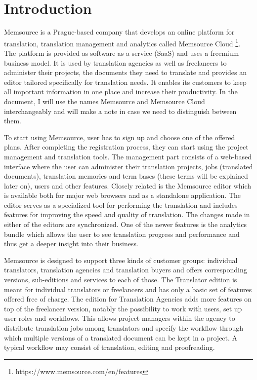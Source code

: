 
\chapter{Introduction}

Memsource is a Prague-based company that develops an online platform for translation, translation management and analytics called Memsource Cloud \footnote{https://www.memsource.com/en/features}. The platform is provided as software as a service (SaaS) and uses a freemium business model. It is used by translation agencies as well as freelancers to administer their projects, the documents they need to translate and provides an editor tailored specifically for translation needs. It enables its customers to keep all important information in one place and increase their productivity. In the document, I will use the names Memsource and Memsource Cloud interchangeably and will make a note in case we need to distinguish between them.

To start using Memsource, user has to sign up and choose one of the offered plans. After completing the registration process, they can start using the project management and translation tools. The management part consists of a web-based interface where the user can administer their translation projects, jobs (translated documents), translation memories and term bases (these terms will be explained later on), users and other features. Closely related is the Memsource editor which is available both for major web browsers and as a standalone application. The editor serves as a specialized tool for performing the translation and includes features for improving the speed and quality of translation. The changes made in either of the editors are synchronized. One of the newer features is the analytics bundle which allows the user to see translation progress and performance and thus get a deeper insight into their business.

Memsource is designed to support three kinds of customer groups: individual translators, translation agencies and translation buyers and offers corresponding versions, sub-editions and services to each of those.
The Translator edition is meant for individual translators or freelancers and has only a basic set of features offered free of charge. The edition for Translation Agencies adds more features on top of the freelancer version, notably the possibility to work with users, set up user roles and workflows. This allows project managers within the agency to distribute translation jobs among translators and specify the workflow through which multiple versions of a translated document can be kept in a project. A typical workflow may consist of translation, editing and proofreading.

